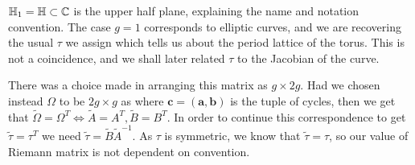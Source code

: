 \documentclass{article}
\begin{document}
\begin{example}
	$\mathbb{H}_1 = \mathbb{H} \subset \mathbb{C}$ is the upper half plane, explaining the name and notation convention. The case $g=1$ corresponds to elliptic curves, and we are recovering the usual $\tau$ we assign which tells us about the period lattice of the torus. This is not a coincidence, and we shall later related $\tau$ to the Jacobian of the curve. 
\end{example}


\begin{remark}
	There was a choice made in arranging this matrix as $g \times 2g$. Had we chosen instead $\Omega$ to be $2g \times g$ as 
where $\bm{c} = (\bm{a},\bm{b})$ is the tuple of cycles, then we get that $\tilde{\Omega} = \Omega^T \Leftrightarrow \tilde{A}=A^T, \tilde{B} = B^T$. In order to continue this correspondence to get $\tilde{\tau} = \tau^T$ we need $\tilde{\tau} = \tilde{B} \tilde{A}^{-1}$. As $\tau$ is symmetric, we know that $\tilde{\tau} = \tau$, so our value of Riemann matrix is not dependent on convention. 
\end{remark}
\end{document}

